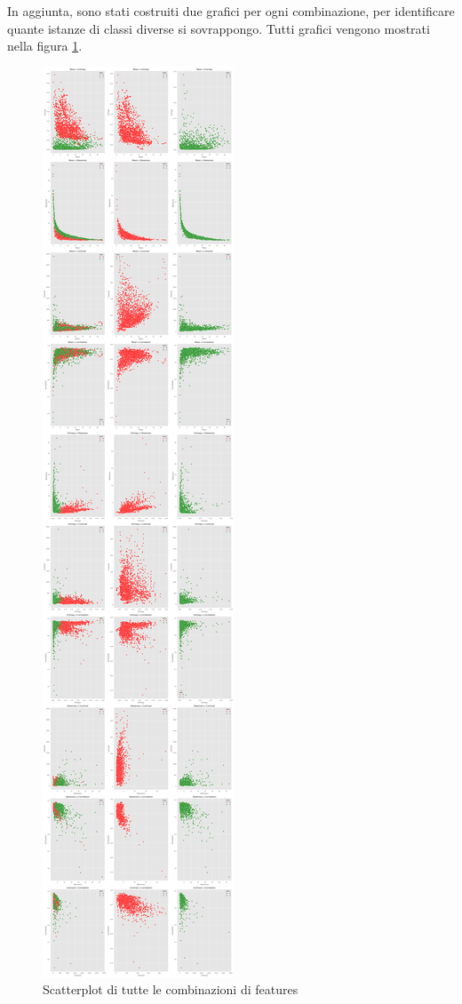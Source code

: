 In aggiunta, sono stati costruiti due grafici per ogni combinazione, per
identificare quante istanze di classi diverse si sovrappongo. Tutti grafici
vengono mostrati nella figura \ref{fig:scatterplot_features}.
\newpage
\begin{figure}[!ht]
      \centering
      \includegraphics[height=\textheight]{img/analisi/scatterplot.png}
      \caption{Scatterplot di tutte le combinazioni di features}
      \label{fig:scatterplot_features}
\end{figure}

